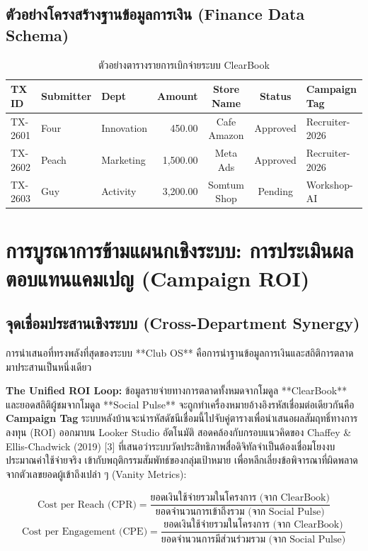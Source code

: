 \documentclass[10pt,a4paper]{article}
\begin{document}
\subsection{ตัวอย่างโครงสร้างฐานข้อมูลการเงิน (Finance Data Schema)}
\begin{table}[h!]
  \centering
  \caption{\chulafont ตัวอย่างตารางรายการเบิกจ่ายระบบ ClearBook}
  \begin{tabular}{lllrccl}
    \toprule
    \textbf{TX ID} & \textbf{Submitter} & \textbf{Dept} & \textbf{Amount} & \textbf{Store Name} & \textbf{Status} & \textbf{Campaign Tag} \\
    \midrule
    TX-2601 & Four & Innovation & 450.00 & Cafe Amazon & Approved & Recruiter-2026 \\
    TX-2602 & Peach & Marketing & 1,500.00 & Meta Ads & Approved & Recruiter-2026 \\
    TX-2603 & Guy & Activity & 3,200.00 & Somtum Shop & Pending & Workshop-AI \\
    \bottomrule
  \end{tabular}
\end{table}

\newpage

\section{การบูรณาการข้ามแผนกเชิงระบบ: การประเมินผลตอบแทนแคมเปญ (Campaign ROI)}
\subsection{จุดเชื่อมประสานเชิงระบบ (Cross-Department Synergy)}
การนำเสนอที่ทรงพลังที่สุดของระบบ **Club OS** คือการนำฐานข้อมูลการเงินและสถิติการตลาดมาประสานเป็นหนึ่งเดียว

\begin{highlightbox}
  \noindent \textbf{The Unified ROI Loop:} 
  ข้อมูลรายจ่ายทางการตลาดทั้งหมดจากโมดูล **ClearBook** และยอดสถิติผู้ชมจากโมดูล **Social Pulse** จะถูกทำเครื่องหมายอ้างอิงรหัสเชื่อมต่อเดียวกันคือ \textbf{Campaign Tag} ระบบหลังบ้านจะนำรหัสดัชนีเชื่อมนี้ไปจับคู่ตารางเพื่อนำเสนอผลสัมฤทธิ์ทางการลงทุน (ROI) ออกมาบน Looker Studio อัตโนมัติ สอดคล้องกับกรอบแนวคิดของ Chaffey \& Ellis-Chadwick (2019) [3] ที่เสนอว่าระบบวัดประสิทธิภาพสื่อดิจิทัลจำเป็นต้องเชื่อมโยงงบประมาณค่าใช้จ่ายจริง เข้ากับพฤติกรรมสัมพัทธ์ของกลุ่มเป้าหมาย เพื่อหลีกเลี่ยงข้อพิจารณาที่ผิดพลาดจากตัวเลขยอดผู้เข้าถึงเปล่า ๆ (Vanity Metrics):
\end{highlightbox}

\begin{equation}
  \text{Cost per Reach (CPR)} = \frac{\text{ยอดเงินใช้จ่ายรวมในโครงการ (จาก ClearBook)}}{\text{ยอดจำนวนการเข้าถึงรวม (จาก Social Pulse)}}
\end{equation}
\begin{equation}
  \text{Cost per Engagement (CPE)} = \frac{\text{ยอดเงินใช้จ่ายรวมในโครงการ (จาก ClearBook)}}{\text{ยอดจำนวนการมีส่วนร่วมรวม (จาก Social Pulse)}}
\end{equation}
\end{document}
